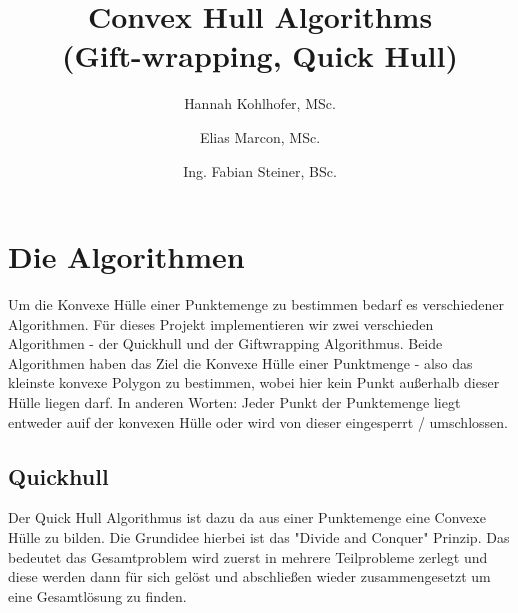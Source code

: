 \documentclass[Labor, MSC, german]{twbook}
\title{Convex Hull Algorithms \\ (Gift-wrapping, Quick Hull)}
\author{Hannah Kohlhofer, MSc.\and Elias Marcon, MSc. \and Ing. Fabian Steiner, BSc.}
\begin{document}
\maketitle


\chapter{Die Algorithmen}
Um die Konvexe Hülle einer Punktemenge zu bestimmen bedarf es verschiedener Algorithmen. Für dieses Projekt implementieren wir zwei verschieden Algorithmen - der Quickhull und der Giftwrapping Algorithmus. Beide Algorithmen haben das Ziel die Konvexe Hülle einer Punktmenge - also das kleinste konvexe Polygon zu bestimmen, wobei hier kein Punkt außerhalb dieser Hülle liegen darf. In anderen Worten: Jeder Punkt der Punktemenge liegt entweder auif der konvexen Hülle oder wird von dieser eingesperrt / umschlossen.



\section{Quickhull}
Der Quick Hull Algorithmus ist dazu da aus einer Punktemenge eine Convexe Hülle zu bilden. Die Grundidee hierbei ist das "Divide and Conquer" Prinzip. Das bedeutet das Gesamtproblem wird zuerst in mehrere Teilprobleme zerlegt und diese werden dann für sich gelöst und abschließen wieder zusammengesetzt um eine Gesamtlösung zu finden.
\end{document}
